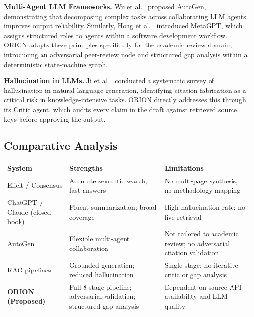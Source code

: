 \documentclass[12pt, a4paper]{article}
\begin{document}
\textbf{Multi-Agent LLM Frameworks.}
Wu et al.\ \cite{wu2023autogen} proposed AutoGen, demonstrating that decomposing complex
tasks across collaborating LLM agents improves output reliability. Similarly, Hong et al.\
\cite{hong2023metagpt} introduced MetaGPT, which assigns structured roles to agents within
a software development workflow. ORION adapts these principles specifically for the academic
review domain, introducing an adversarial peer-review node and structured gap analysis within
a deterministic state-machine graph.

\textbf{Hallucination in LLMs.}
Ji et al.\ \cite{ji2023hallucination} conducted a systematic survey of hallucination in natural
language generation, identifying citation fabrication as a critical risk in knowledge-intensive
tasks. ORION directly addresses this through its Critic agent, which audits every claim in the
draft against retrieved source keys before approving the output.

\subsection{Comparative Analysis}

\vspace{0.3cm}
\renewcommand{\arraystretch}{1.5}
\begin{tabular}{|p{3.5cm}|p{4.2cm}|p{5.2cm}|}
    \hline
    \textbf{System} & \textbf{Strengths} & \textbf{Limitations} \\
    \hline
    Elicit / Consensus \cite{elicit2023}
        & Accurate semantic search; fast answers
        & No multi-page synthesis; no methodology mapping \\
    \hline
    ChatGPT / Claude (closed-book)
        & Fluent summarization; broad coverage
        & High hallucination rate; no live retrieval \cite{ji2023hallucination} \\
    \hline
    AutoGen \cite{wu2023autogen}
        & Flexible multi-agent collaboration
        & Not tailored to academic review; no adversarial citation validation \\
    \hline
    RAG pipelines \cite{lewis2020rag}
        & Grounded generation; reduced hallucination
        & Single-stage; no iterative critic or gap analysis \\
    \hline
    \textbf{ORION (Proposed)}
        & Full 8-stage pipeline; adversarial validation; structured gap analysis
        & Dependent on source API availability and LLM quality \\
    \hline
\end{tabular}
\end{document}

